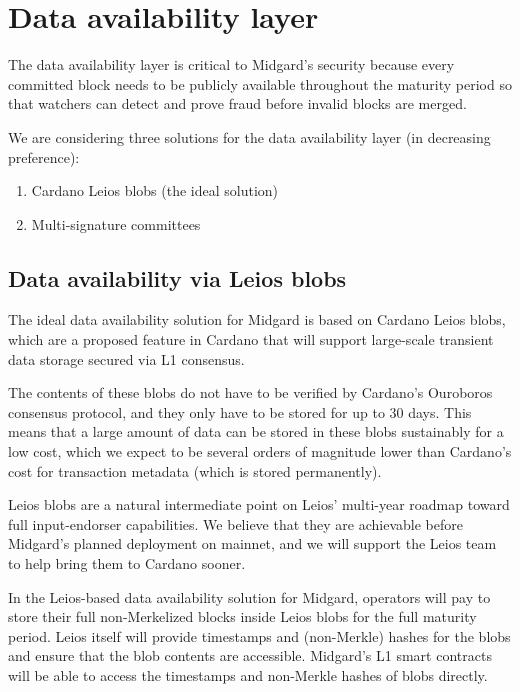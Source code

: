 \documentclass[../midgard.tex]{subfiles}
\begin{document}
\section{Data availability layer}
\label{h:data-availability-layer}

The data availability layer is critical to Midgard's security because every committed block needs to be publicly available throughout the maturity period so that watchers can detect and prove fraud before invalid blocks are merged.

We are considering three solutions for the data availability layer (in decreasing preference):
\begin{enumerate}
  \item Cardano Leios blobs (the ideal solution)
  \item Multi-signature committees
\end{enumerate}

\subsection{Data availability via Leios blobs}
\label{h:data-availability-leios}

The ideal data availability solution for Midgard is based on Cardano Leios blobs, which are a proposed feature in Cardano that will support large-scale transient data storage secured via L1 consensus.

The contents of these blobs do not have to be verified by Cardano's Ouroboros consensus protocol, and they only have to be stored for up to 30 days.
This means that a large amount of data can be stored in these blobs sustainably for a low cost, which we expect to be several orders of magnitude lower than Cardano's cost for transaction metadata (which is stored permanently).

Leios blobs are a natural intermediate point on Leios' multi-year roadmap toward full input-endorser capabilities.
We believe that they are achievable before Midgard's planned deployment on mainnet, and we will support the Leios team to help bring them to Cardano sooner.

In the Leios-based data availability solution for Midgard, operators will pay to store their full non-Merkelized blocks inside Leios blobs for the full maturity period.
Leios itself will provide timestamps and (non-Merkle) hashes for the blobs and ensure that the blob contents are accessible.
Midgard's L1 smart contracts will be able to access the timestamps and non-Merkle hashes of blobs directly.
\end{document}
